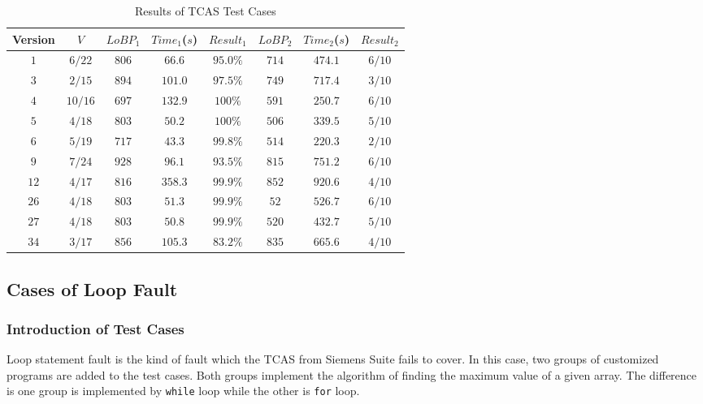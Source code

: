 \begin{table}
\small
\center
\caption{Results of TCAS Test Cases}
\label{table:RoTCASTC}
\begin{tabular}{|c|c|c|c|c|c|c|c|}
\hline
Version & $V$     & $LoBP_{1}$ & $Time_{1}$($s$) & $Result_{1}$ &$LoBP_{2}$ & $Time_{2}$($s$) & $Result_{2}$ \\
\hline
$1$     & $6/22$  & $806$      & $66.6$          & $95.0\%$     & $714$     & $474.1$         & $6/10$       \\
\hline
$3$     & $2/15$  & $894$      & $101.0$         & $97.5\%$     & $749$     & $717.4$         & $3/10$       \\
\hline
$4$	    & $10/16$ & $697$      & $132.9$         & $100\%$      & $591$     & $250.7$         & $6/10$       \\
\hline
$5$	    & $4/18$  & $803$      & $50.2$          & $100\%$      & $506$     & $339.5$         & $5/10$       \\
\hline
$6$	    & $5/19$  & $717$      & $43.3$          & $99.8\%$     & $514$     & $220.3$         & $2/10$       \\
\hline
$9$	    & $7/24$  & $928$      & $96.1$          & $93.5\%$     & $815$     & $751.2$         & $6/10$       \\
\hline
$12$    & $4/17$  & $816$      & $358.3$         & $99.9\%$     & $852$     & $920.6$         & $4/10$       \\
\hline
$26$    & $4/18$  & $803$      & $51.3$          & $99.9\%$     & $52$      & $526.7$         & $6/10$       \\
\hline
$27$    & $4/18$  & $803$      & $50.8$          & $99.9\%$     & $520$     & $432.7$         & $5/10$       \\
\hline
$34$    & $3/17$  & $856$      & $105.3$         & $83.2\%$     & $835$     & $665.6$         & $4/10$       \\
\hline
\end{tabular}
\end{table}

\subsection{Cases of Loop Fault}
\subsubsection{Introduction of Test Cases}
Loop statement fault is the kind of fault which the TCAS from Siemens Suite fails to cover.
In this case, two groups of customized programs are added to the test cases. Both groups implement the algorithm of finding the maximum value of a given array.
The difference is one group is implemented by \lstinline|while| loop while the other is \lstinline|for| loop.

